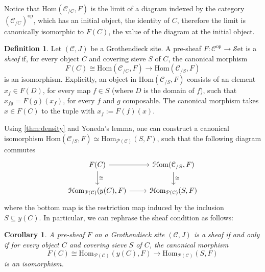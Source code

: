 \documentclass[a4paper]{book}
\newcommand{\lC}{\mathcal{C}}
\newcommand{\lH}{\mathcal{H}}
\newcommand{\lP}{\mathcal{P}}
\newcommand{\lS}{\mathcal{S}}
\newcommand{\op}{\mathrm{op}}
\newcommand{\set}{\lS\mathrm{et}} %
\newcommand{\Hom}{\lH\mathrm{om}} %
\renewcommand{\hom}{\mathrm{Hom}} %
\newtheorem{corollary}[equation]{Corollary}
\theoremstyle{definition}
\newtheorem{definition}[equation]{Definition}
\theoremstyle{remark}
\numberwithin{equation}{section}
\begin{document}
	 Notice that $\hom(\lC_{/C},F)$ is the limit of a diagram indexed by the category $(\lC_{/C})^{\op}$, which has an initial object, the identity of $C$, therefore the limit is canonically isomorphic to $F(C)$, the value of the diagram at the initial object.
	\begin{definition}
		Let $(\lC, J)$ be a Grothendieck site. A {pre-sheaf} $F : \lC^{\op} \to \set$ is a \emph{sheaf} if, for every object $C$ and covering sieve $S$ of $C$, the canonical morphism
		\[ F(C)\cong\hom(\lC_{/C},F) \to \hom(\lC_{/S},F)\]
		is an isomorphism. Explicitly, an object in $\hom(\lC_{/S},F)$ consists of an element $x_f\in F(D)$, for every map $f\in S$ (where $D$ is the domain of $f$), such that $x_{fg}=F(g)(x_f)$, for every $f$ and $g$ composable. The canonical morphism takes $x\in F(C)$ to the tuple with $x_f:=F(f)(x)$. 
	\end{definition}Using \cref{thm:density} and Yoneda's lemma, one can construct a canonical isomorphism $\hom(\lC_{/S},F)\simeq\hom_{\lP(\lC)}(S,F)$, such that the following diagram commutes \begin{equation}
		\begin{tikzcd}
			F(C) \arrow[d,"\cong"] \arrow[r] & \Hom(\lC_{/S},F) \arrow[d,"\cong"] \\
			\Hom_{\lP(\lC)}(y(C),F) \arrow[r] & \Hom_{\lP(\lC)}(S,F)
		\end{tikzcd}
	\end{equation}where the bottom map is the restriction map induced by the inclusion $S\subseteq y(C)$. In particular, we can rephrase the sheaf condition as follows:
	\begin{corollary}
		A pre-sheaf $F$ on a Grothendieck site $(\lC, J)$ is a sheaf if and only if for every object $C$ and covering sieve $S$ of $C$, the canonical morphism
		\[ F(C)  \cong \hom_{\lP(\lC)}(y(C),F)\to \hom_{\lP(\lC)}(S,F) \]
		is an isomorphism. 
	\end{corollary}
	
\end{document}

